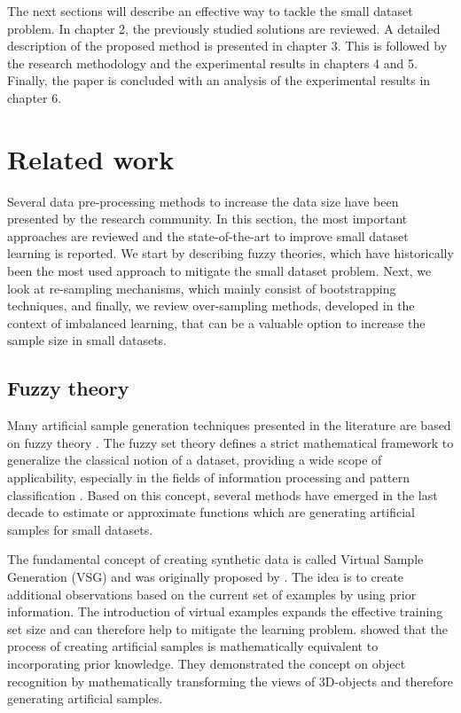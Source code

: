\documentclass[parskip=full]{scrartcl}
\begin{document}
The next sections will describe an effective way to tackle the small dataset
problem. In chapter 2, the previously studied solutions are reviewed. A detailed
description of the proposed method is presented in chapter 3. This is followed
by the research methodology and the experimental results in chapters 4 and 5.
Finally, the paper is concluded with an analysis of the experimental results in
chapter 6.

\section{Related work}

Several data pre-processing methods to increase the data size have been
presented by the research community. In this section, the most important
approaches are reviewed and the state-of-the-art to improve small dataset
learning is reported. We start by describing fuzzy theories, which have
historically been the most used approach to mitigate the small dataset problem.
Next, we look at re-sampling mechanisms, which mainly consist of bootstrapping
techniques, and finally, we review over-sampling methods, developed in the
context of imbalanced learning, that can be a valuable option to increase the
sample size in small datasets.

\subsection{Fuzzy theory}

Many artificial sample generation techniques presented in the literature are
based on fuzzy theory \cite{AbdulLateh.2017}. The fuzzy set theory defines a
strict mathematical framework to generalize the classical notion of a dataset,
providing a wide scope of applicability, especially in the fields of information
processing and pattern classification \cite{Zimmermann.2010}. Based on this
concept, several methods have emerged in the last decade to estimate or
approximate functions which are generating artificial samples for small datasets.

The fundamental concept of creating synthetic data is called Virtual Sample
Generation (VSG) and was originally proposed by \cite{Niyogi.1998}. The idea is
to create additional observations based on the current set of examples by using
prior information. The introduction of virtual examples expands the effective
training set size and can therefore help to mitigate the learning problem.
\cite{Niyogi.1998} showed that the process of creating artificial samples is
mathematically equivalent to incorporating prior knowledge. They demonstrated
the concept on object recognition by mathematically transforming the views of
3D-objects and therefore generating artificial samples.
\end{document}
